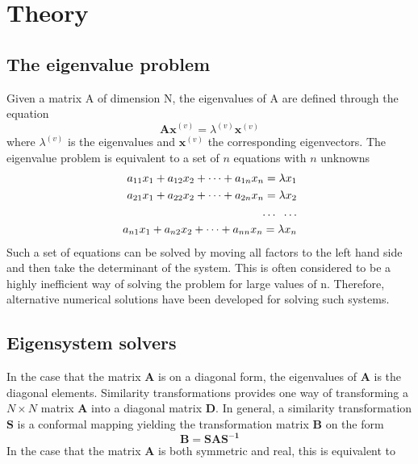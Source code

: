 \documentclass[%
reprint,
amsmath, 
amssymb, 
aps,]{revtex4-1}
\begin{document}
	\section*{Theory}
		\subsection{The eigenvalue problem} \noindent 
Given a matrix A of dimension N, the eigenvalues of A are defined through the equation
			\begin{equation}\label{eigenval}
	\mathbf{Ax}^{(v)} = \lambda^{(v)}\mathbf{x}^{(v)}
			\end{equation}
where $\lambda^{(v)}$ is the eigenvalues and $\mathbf{x}^{(v)}$ the corresponding eigenvectors. The eigenvalue problem is equivalent to a set of $n$ equations with $n$ unknowns 
			\begin{align*}
	a_{11}x_1 + a_{12}x_2 +\dots + a_{1n}x_n = \lambda x_1 \\a_{21}x_1 + a_{22}x_2 +\dots + a_{2n}x_n = \lambda x_2 \\ \dots \hspace{2mm} \dots \\
	a_{n1}x_1 + a_{n2}x_2 +\dots + a_{nn}x_n = \lambda x_n \\
			\end{align*}
Such a set of equations can be solved by moving all factors to the left hand side and then take the determinant of the system. This is often considered to be a highly inefficient way of solving the problem for large values of n. Therefore, alternative numerical solutions have been developed for solving such systems. 

		\subsection{Eigensystem solvers} \noindent 
In the case that the matrix $\mathbf{A}$ is on a diagonal form, the eigenvalues of $\mathbf{A}$ is the diagonal elements. Similarity transformations provides one way of transforming a $N\times N$ matrix $\mathbf{A}$ into a diagonal matrix $\mathbf{D}$. In general, a similarity transformation $\mathbf{S}$ is a conformal mapping yielding the transformation matrix $\mathbf{B}$ on the form
			\begin{equation*}
	\mathbf{B} = \mathbf{SAS^{-1}}
			\end{equation*}
\noindent In the case that the matrix $\mathbf{A}$ is both symmetric and real, this is equivalent to  
\end{document}
